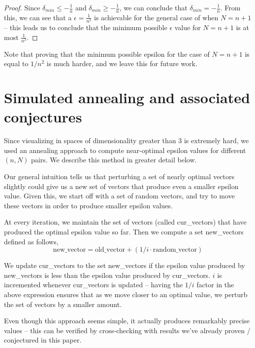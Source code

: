 \documentclass[11pt,letterpaper,twoside,english]{article}
\theoremstyle{theorem}
\theoremstyle{remark}
\begin{document}
\begin{proof}
Since $\delta_{min} \le -\frac{1}{n}$ and $\delta_{min} \ge -\frac{1}{n}$, we can conclude that $\delta_{min}=-\frac{1}{n}$. From this, we can see that a $\epsilon = \frac{1}{n^2}$ is achievable for the general case of when $N=n+1$ -- this leads us to conclude that the minimum possible $\epsilon$ value for $N=n+1$ is at most $\frac{1}{n^2}$.
\end{proof}

Note that proving that the minimum possible epsilon for the case of $N = n+1$ is equal to $1/n^2$ is much harder, and we leave this for future work.

\section{Simulated annealing and associated conjectures}
Since visualizing in spaces of dimensionality greater than $3$ is extremely hard, we used an annealing approach to compute near-optimal epsilon values for different $(n, N)$ pairs. We describe this method in greater detail below.

Our general intuition tells us that perturbing a set of nearly optimal vectors slightly could give us a new set of vectors that produce even a smaller epsilon value. Given this, we start off with a set of random vectors, and try to move these vectors in order to produce smaller epsilon values.

At every iteration, we maintain the set of vectors (called cur\_vectors) that have produced the optimal epsilon value so far. Then we compute a set new\_vectors defined as follows,
$$\text{new\_vector} = \text{old\_vector} + (1/i \cdot \text{random\_vector})$$

We update cur\_vectors to the set new\_vectors if the epsilon value produced by new\_vectors is less than the epsilon value produced by cur\_vectors. $i$ is incremented whenever cur\_vectors is updated -- having the $1/i$ factor in the above expression ensures that as we move closer to an optimal value, we perturb the set of vectors by a smaller amount.

Even though this approach seems simple, it actually produces remarkably precise values -- this can be verified by cross-checking with results we've already proven / conjectured in this paper.
\end{document}
